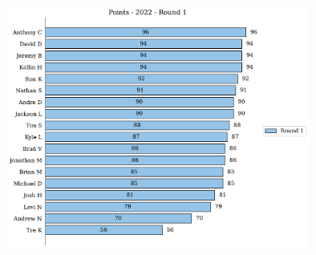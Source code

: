 \documentclass[10pt]{article}
\begin{document}
%
\begin{minipage}[t]{13cm}
    \vspace{0pt}
    \begin{figure}[H]
        \vspace{-1cm}
        \includegraphics[width=12cm,height=8cm,keepaspectratio]{../../figures/2022/Points-2022-Round1.pdf}
    \end{figure}
\end{minipage}
\end{document}
